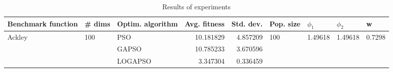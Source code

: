 \begin{table}
\centering
\caption{Results of experiments}
\begin{tabular}{lllrrllll}
\toprule
     Benchmark function &              \# dims & Optim. algorithm &  Avg. fitness &  Std. dev. &            Pop. size &               $\phi_{1}$ &               $\phi_{2}$ &                       w \\
\midrule
\multirow{3}{*}{Ackley} & \multirow{3}{*}{100} &              PSO &     10.181829 &   4.857209 & \multirow{3}{*}{100} & \multirow{3}{*}{1.49618} & \multirow{3}{*}{1.49618} & \multirow{3}{*}{0.7298} \\
                        &                      &            GAPSO &     10.785233 &   3.670596 &                      &                          &                          &                         \\
                        &                      &          LOGAPSO &      3.347304 &   0.336459 &                      &                          &                          &                         \\
\bottomrule
\end{tabular}
\end{table}
